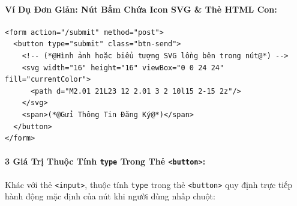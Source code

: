\documentclass[11pt,oneside]{book}
\newcommand{\codeinline}[1]{\textcolor{accentOrange}{\texttt{#1}}}
\begin{document}
\paragraph{Ví Dụ Đơn Giản: Nút Bấm Chứa Icon SVG \& Thẻ HTML Con:}

\begin{codeWindow}
\begin{lstlisting}[language=HTML5]
<form action="/submit" method="post">
  <button type="submit" class="btn-send">
    <!-- (*@Hình ảnh hoặc biểu tượng SVG lồng bên trong nút@*) -->
    <svg width="16" height="16" viewBox="0 0 24 24" fill="currentColor">
      <path d="M2.01 21L23 12 2.01 3 2 10l15 2-15 2z"/>
    </svg>
    <span>(*@Gửi Thông Tin Đăng Ký@*)</span>
  </button>
</form>
\end{lstlisting}
\end{codeWindow}

\begin{browserWindow}
\sffamily\small
{}
\end{browserWindow}

\paragraph{3 Giá Trị Thuộc Tính \codeinline{type} Trong Thẻ \codeinline{<button>}:}

Khác với thẻ \codeinline{<input>}, thuộc tính \codeinline{type} trong thẻ \codeinline{<button>} quy định trực tiếp hành động mặc định của nút khi người dùng nhấp chuột:
\end{document}
